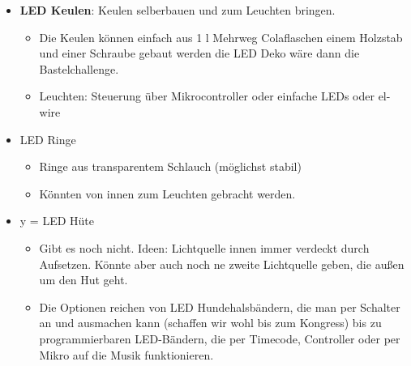 \documentclass[a4]{article}
\begin{document}
\begin{itemize}
\item \textbf{LED Keulen}: Keulen selberbauen und zum Leuchten bringen.

\begin{itemize}
\item Die Keulen können einfach aus 1 l Mehrweg Colaflaschen einem Holzstab und einer Schraube gebaut werden die LED Deko wäre dann die Bastelchallenge.
\item   Leuchten: Steuerung über Mikrocontroller oder einfache LEDs oder el-wire
\end{itemize}

\item    LED Ringe
\begin{itemize}
        \item    Ringe aus transparentem Schlauch (möglichst stabil)
        \item   Könnten von innen zum Leuchten gebracht werden.
\end{itemize}

\item   y = LED Hüte

\begin{itemize}
        \item    Gibt es noch nicht. Ideen: Lichtquelle innen immer verdeckt durch Aufsetzen. Könnte aber auch noch ne zweite Lichtquelle geben, die außen um den Hut geht.
        \item     Die Optionen reichen von LED Hundehalsbändern, die man  per Schalter an und ausmachen kann (schaffen wir wohl bis zum Kongress) bis zu programmierbaren LED-Bändern, die per Timecode, Controller oder per Mikro auf die Musik funktionieren. 
\end{itemize}

\end{itemize} 
\end{document}
